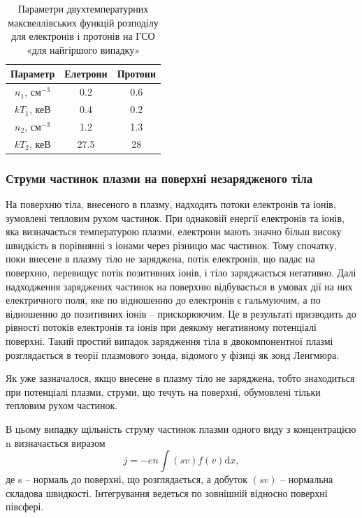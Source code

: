 \documentclass[a4paper,12pt]{article}
\begin{document}
\begin{table}[!ht]
	\caption{Параметри двухтемпературних максвеллівських функцій розподілу
для електронів і протонів на ГСО «для найгіршого випадку»}
    \begin{tabular}{|c|c|c|}
        \hline
        Параметр     & Елетрони & Протони \\ \hline
        $n_1$, см$^{-3}$ & 0.2      & 0.6     \\ \hline
        $kT_1$, кеВ    & 0.4      & 0.2     \\ \hline
        $n_2$, см$^{-3}$ & 1.2      & 1.3     \\ \hline
        $kT_2$, кеВ    & 27.5     & 28      \\
        \hline
    \end{tabular}
    \label{tab:density_table}
\end{table}

\subsubsection{Струми частинок плазми на поверхні незарядженого тіла}
На поверхню тіла, внесеного в плазму, надходять потоки електронів та іонів, зумовлені тепловим рухом частинок. При однаковій енергії електронів та іонів, яка визначається  температурою плазми, електрони мають значно більш високу швидкість в порівнянні з іонами через різницю мас частинок. Тому спочатку, поки внесене в плазму тіло не заряджена, потік електронів, що падає на поверхню, перевищує потік позитивних іонів, і тіло заряджається негативно. Далі надходження заряджених частинок на поверхню відбувається в умовах дії на них електричного поля, яке по відношенню до електронів є гальмуючим, а по відношенню до позитивних іонів -- прискорюючим. Це в результаті призводить до рівності потоків електронів та іонів при деякому негативному потенціалі поверхні. Такий простий випадок зарядження тіла в двокомпонентної плазмі розглядається в теорії плазмового зонда, відомого у фізиці як зонд Ленгмюра.


Як уже зазначалося, якщо внесене в плазму тіло не заряджена, тобто знаходиться при потенціалі плазми, струми, що течуть на поверхні, обумовлені тільки тепловим рухом частинок.


В цьому випадку щільність струму частинок плазми одного виду з концентрацією n визначається виразом
\[
j = -en \int (sv) f(v) \mathrm{d}x,
\]
де s -- нормаль до поверхні, що розглядається, а добуток $(sv)$ -- нормальна складова швидкості. Інтегрування ведеться по зовнішній відносно поверхні півсфері.
\end{document}
